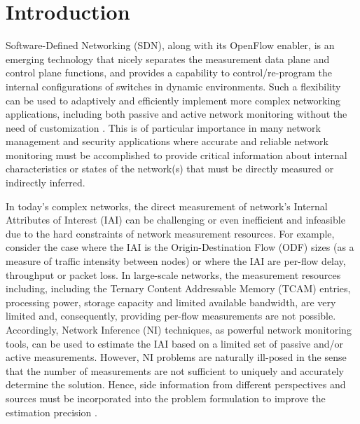 \section{Introduction}  \label{sec:SNIPERIntro} 
Software-Defined Networking (SDN), along with its OpenFlow enabler, is an emerging technology that nicely separates the measurement data plane and control plane functions, and provides a capability to control/re-program the internal configurations of switches in dynamic environments. Such a flexibility can be used to adaptively and efficiently implement more complex networking applications, including both passive and active network monitoring without the need of customization \cite{****}. This is of particular importance in many network management and security applications where accurate and reliable network monitoring must be accomplished to provide critical information about internal characteristics or states of the network(s) that must be directly measured or indirectly inferred. 

In today's complex networks, the direct measurement of network's Internal Attributes of Interest (IAI) can be challenging or even inefficient and infeasible due to the hard constraints of network measurement resources. For example, consider the case where the IAI is the Origin-Destination Flow (ODF) sizes (as a measure of traffic intensity between nodes) or where the IAI are per-flow delay, throughput or packet loss. In large-scale networks, the measurement resources including, including the Ternary Content Addressable Memory (TCAM) entries, processing power, storage capacity and limited available bandwidth, are very limited and, consequently, providing per-flow measurements are not possible. Accordingly, Network Inference (NI) techniques, as powerful network monitoring tools, can be used to estimate the IAI based on a limited set of passive and/or active measurements. However, NI problems are naturally ill-posed in the sense that the number of measurements are not sufficient to uniquely and accurately determine the solution. Hence, side information from different perspectives and sources must be incorporated into the problem formulation to improve the estimation precision \cite{QZhao:2006} \cite{MDFE:2013} \cite{HNguyen:2007}. %

